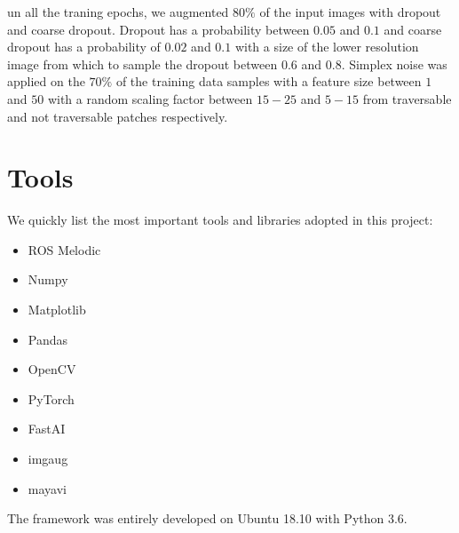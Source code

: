 \documentclass[../document.tex]{subfiles}
\begin{document}
un all the traning epochs, we augmented $80\%$ of the input images with dropout and coarse dropout. Dropout has a probability between $0.05$ and $0.1$ and coarse dropout has a probability of $0.02$ and $0.1$ with a size of the lower resolution image from which to sample the dropout between $0.6$ and $0.8$. Simplex noise was applied on the $70\%$ of the training data samples with a feature size between $1$ and $50$ with a random scaling factor between $15 - 25$ and $5 - 15$ from traversable and not traversable patches respectively. 

\section{Tools}
We quickly list the most important tools and libraries adopted in this project:
\begin{itemize}
    \item ROS Melodic
    \item Numpy
    \item Matplotlib
    \item Pandas
    \item OpenCV
    \item PyTorch
    \item FastAI
    \item imgaug
    \item mayavi
\end{itemize}
The framework was entirely developed on Ubuntu 18.10 with Python 3.6.
\end{document}
